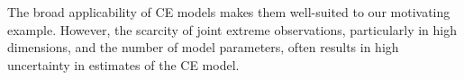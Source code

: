 \documentclass[12pt,compact]{article}
\begin{document}
The broad applicability of CE models makes them well-suited to our motivating example.
However, the scarcity of joint extreme observations, particularly in high dimensions, and the number of model parameters, often results in high uncertainty in estimates of the CE model.
\end{document}
